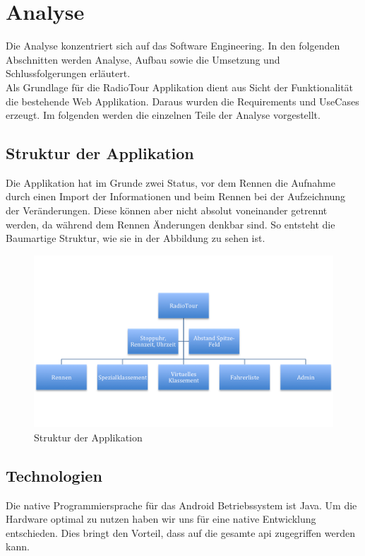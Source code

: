\chapter{Analyse}
Die Analyse konzentriert sich auf das Software Engineering. In den folgenden Abschnitten werden Analyse, Aufbau sowie die Umsetzung und Schlussfolgerungen erläutert.
\\

Als Grundlage für die RadioTour Applikation dient aus Sicht der Funktionalität die bestehende Web Applikation. Daraus wurden die Requirements und UseCases erzeugt. Im folgenden werden die einzelnen Teile der Analyse vorgestellt.

\section{Struktur der Applikation}
Die Applikation hat im Grunde zwei Status, vor dem Rennen die Aufnahme durch einen Import der Informationen und beim Rennen bei der Aufzeichnung der Veränderungen. Diese können aber nicht absolut voneinander getrennt werden, da während dem Rennen Änderungen denkbar sind. So entsteht die Baumartige Struktur, wie sie in der Abbildung zu sehen ist.

\begin{figure}[h!]
\caption{Struktur der Applikation}
\centering
\includegraphics{technischerbericht/analyse/images/struktur.png}
\end{figure} 


\section{Technologien}
Die native Programmiersprache für das Android Betriebssystem ist Java. Um die Hardware optimal zu nutzen haben wir uns für eine native Entwicklung entschieden. Dies bringt den Vorteil, dass auf die gesamte \gls{api} zugegriffen werden kann.

